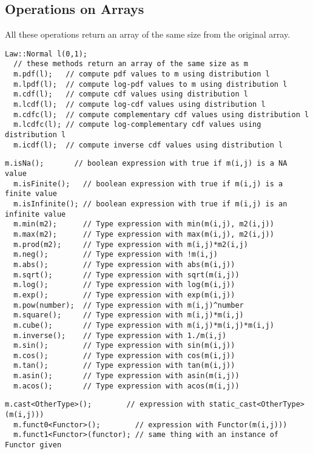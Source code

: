 \documentclass[a4paper,10pt]{article}
\begin{document}
\subsection{Operations on Arrays}
All these operations return an array of the same size from the original array.

\begin{lstlisting}[style=customcpp,caption=Probabilities and related operations]
  Law::Normal l(0,1);
  // these methods return an array of the same size as m
  m.pdf(l);   // compute pdf values to m using distribution l
  m.lpdf(l);  // compute log-pdf values to m using distribution l
  m.cdf(l);   // compute cdf values using distribution l
  m.lcdf(l);  // compute log-cdf values using distribution l
  m.cdfc(l);  // compute complementary cdf values using distribution l
  m.lcdfc(l); // compute log-complementary cdf values using distribution l
  m.icdf(l);  // compute inverse cdf values using distribution l
\end{lstlisting}

\begin{lstlisting}[style=customcpp,caption=Mathematical functions]
  m.isNa();       // boolean expression with true if m(i,j) is a NA value
  m.isFinite();   // boolean expression with true if m(i,j) is a finite value
  m.isInfinite(); // boolean expression with true if m(i,j) is an infinite value
  m.min(m2);      // Type expression with min(m(i,j), m2(i,j))
  m.max(m2);      // Type expression with max(m(i,j), m2(i,j))
  m.prod(m2);     // Type expression with m(i,j)*m2(i,j)
  m.neg();        // Type expression with !m(i,j)
  m.abs();        // Type expression with abs(m(i,j))
  m.sqrt();       // Type expression with sqrt(m(i,j))
  m.log();        // Type expression with log(m(i,j))
  m.exp();        // Type expression with exp(m(i,j))
  m.pow(number);  // Type expression with m(i,j)^number
  m.square();     // Type expression with m(i,j)*m(i,j)
  m.cube();       // Type expression with m(i,j)*m(i,j)*m(i,j)
  m.inverse();    // Type expression with 1./m(i,j)
  m.sin();        // Type expression with sin(m(i,j))
  m.cos();        // Type expression with cos(m(i,j))
  m.tan();        // Type expression with tan(m(i,j))
  m.asin();       // Type expression with asin(m(i,j))
  m.acos();       // Type expression with acos(m(i,j))
\end{lstlisting}

\begin{lstlisting}[style=customcpp,caption=Miscellaneous functions]
  m.cast<OtherType>();        // expression with static_cast<OtherType>(m(i,j)))
  m.funct0<Functor>();        // expression with Functor(m(i,j)))
  m.funct1<Functor>(functor); // same thing with an instance of Functor given
\end{lstlisting}
\end{document}
